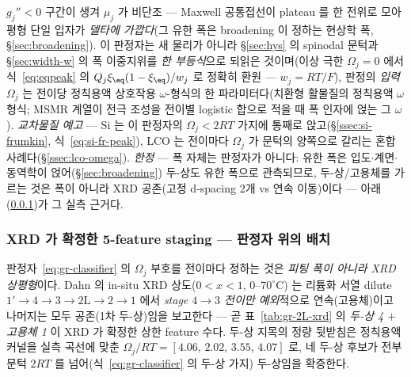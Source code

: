 $g_j''<0$ 구간이 생겨 $\mu_j$ 가 비단조 --- Maxwell 공통접선이 plateau 를 한 전위로 모아 평형 단일 입자가
\emph{델타에 가깝다}(그 유한 폭은 broadening 이 정하는 현상학 폭, \S\ref{sec:broadening}). 이 판정자는 새 물리가
아니라 \S\ref{sec:hys} 의 spinodal 문턱과 \S\ref{sec:width-w} 의 폭 이중지위를 \emph{한 부등식}으로 되읽은
것이며(이상 극한 $\Omega_j{=}0$ 에서 식~\eqref{eq:eqpeak} 의 $Q_j\xi_\eq(1-\xi_\eq)/w_j$ 로 정확히 환원 ---
$w_j{=}RT/F$), 판정의 \emph{입력} $\Omega_j$ 는 전이당 정칙용액 상호작용 $\omega$-형식의 한 파라미터다(치환형
활물질의 정칙용액 $\omega$ 형식\cite{verbrugge2017}; MSMR 계열이 전극 조성을 전이별 logistic 합으로 적을 때
폭 인자에 얹는 그 $\omega$\cite{msmr_partII}). \emph{교차물질 예고} --- Si 는 이 판정자의
$\Omega_j<2RT$ 가지에 통째로 앉고(\S\ref{ssec:si-frumkin}, 식~\eqref{eq:si-fr-peak}), LCO 는 전이마다 $\Omega_j$
가 문턱의 양쪽으로 갈리는 혼합 사례다(\S\ref{ssec:lco-omega}). \emph{한정} --- 폭 자체는 판정자가 아니다:
유한 폭은 입도$\cdot$계면$\cdot$동역학이 얹어(\S\ref{sec:broadening}) 두-상도 유한 폭으로 관측되므로, 두-상/고용체를
가르는 것은 폭이 아니라 XRD 공존(고정 d-spacing 2개 vs 연속 이동)이다\cite{dahn1991} --- 아래 (\ref{ssec:gr-2L-xrd})가
그 실측 근거다.

\subsubsection{XRD 가 확정한 5-feature staging --- 판정자 위의 배치}\label{ssec:gr-2L-xrd}
판정자~\eqref{eq:gr-classifier} 의 $\Omega_j$ 부호를 전이마다 정하는 것은 \emph{피팅 폭이 아니라 XRD 상평형}이다.
Dahn 의 in-situ XRD 상도($0\!<\!x\!<\!1$, $0$--$70^\circ$C)\cite{dahn1991} 는 리튬화 서열
dilute $1'\!\to\!4\!\to\!3\!\to\!2\mathrm L\!\to\!2\!\to\!1$ 에서 \emph{stage $4\!\to\!3$ 전이만 예외}적으로 연속(고용체)이고
나머지는 모두 공존(1차 두-상)임을 보고한다 --- 곧 표~\ref{tab:gr-2L-xrd} 의 \emph{두-상 4 $+$ 고용체 1} 이
XRD 가 확정한 상한 feature 수다. 두-상 지목의 정량 뒷받침은 정칙용액 커널을 실측 곡선에 맞춘
$\Omega_j/RT=[4.06,\,2.02,\,3.55,\,4.07]$ 로, 네 두-상 후보가 전부 문턱 $2RT$ 를 넘어(식~\eqref{eq:gr-classifier}
의 두-상 가지) 두-상임을 확증한다.


